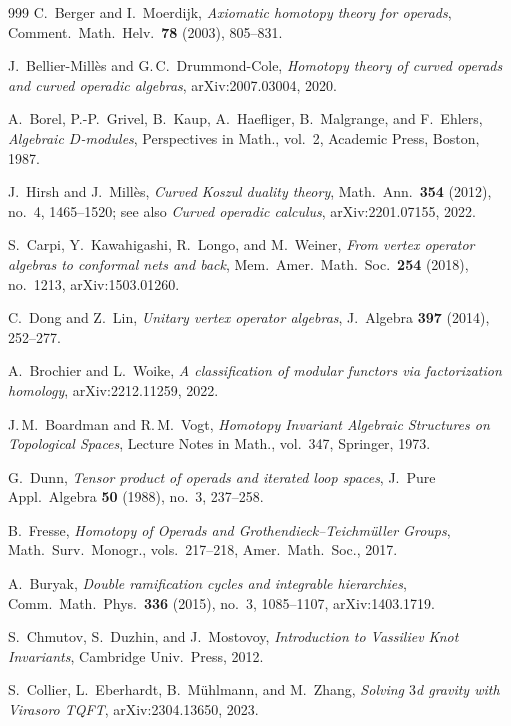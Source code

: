 \documentclass[11pt]{memoir}
\begin{document}
\begin{thebibliography}{999}
 C.~Berger and I.~Moerdijk, \emph{Axiomatic homotopy theory for operads}, Comment.\ Math.\ Helv.\ \textbf{78} (2003), 805--831.

 J.~Bellier-Mill\`es and G.\,C.~Drummond-Cole, \emph{Homotopy theory of curved operads and curved operadic algebras}, arXiv:2007.03004, 2020.

 A.~Borel, P.-P.~Grivel, B.~Kaup, A.~Haefliger, B.~Malgrange, and F.~Ehlers, \emph{Algebraic $D$-modules}, Perspectives in Math., vol.~2, Academic Press, Boston, 1987.

 J.~Hirsh and J.~Mill\`es, \emph{Curved Koszul duality theory}, Math.\ Ann.\ \textbf{354} (2012), no.~4, 1465--1520; see also \emph{Curved operadic calculus}, arXiv:2201.07155, 2022.

 S.~Carpi, Y.~Kawahigashi, R.~Longo, and M.~Weiner, \emph{From vertex operator algebras to conformal nets and back}, Mem.\ Amer.\ Math.\ Soc.\ \textbf{254} (2018), no.~1213, arXiv:1503.01260.

 C.~Dong and Z.~Lin, \emph{Unitary vertex operator algebras}, J.~Algebra \textbf{397} (2014), 252--277.

 A.~Brochier and L.~Woike, \emph{A classification of modular functors via factorization homology}, arXiv:2212.11259, 2022.

 J.\,M.~Boardman and R.\,M.~Vogt, \emph{Homotopy Invariant Algebraic Structures on Topological Spaces}, Lecture Notes in Math., vol.~347, Springer, 1973.

 G.~Dunn, \emph{Tensor product of operads and iterated loop spaces}, J.~Pure Appl.\ Algebra \textbf{50} (1988), no.~3, 237--258.

 B.~Fresse, \emph{Homotopy of Operads and Grothendieck--Teichm\"uller Groups}, Math.\ Surv.\ Monogr., vols.~217--218, Amer.\ Math.\ Soc., 2017.

 A.~Buryak, \emph{Double ramification cycles and integrable hierarchies}, Comm.\ Math.\ Phys.\ \textbf{336} (2015), no.~3, 1085--1107, arXiv:1403.1719.

 S.~Chmutov, S.~Duzhin, and J.~Mostovoy, \emph{Introduction to Vassiliev Knot Invariants}, Cambridge Univ.\ Press, 2012.

 S.~Collier, L.~Eberhardt, B.~M\"uhlmann, and M.~Zhang, \emph{Solving $3$d gravity with Virasoro TQFT}, arXiv:2304.13650, 2023.


\end{thebibliography}
\end{document}
